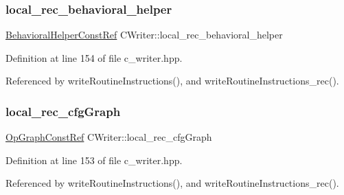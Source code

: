 \mbox{\label{classCWriter_a5bbe68dac066fd15c07a12e30b3da38a}} 
\subsubsection{\texorpdfstring{local\+\_\+rec\+\_\+behavioral\+\_\+helper}{local\_rec\_behavioral\_helper}}
{\footnotesize\ttfamily \hyperlink{behavioral__helper_8hpp_aae973b54cac87eef3b27442aa3e1e425}{Behavioral\+Helper\+Const\+Ref} C\+Writer\+::local\+\_\+rec\+\_\+behavioral\+\_\+helper\hspace{0.3cm}{\ttfamily [protected]}}



Definition at line 154 of file c\+\_\+writer.\+hpp.



Referenced by write\+Routine\+Instructions(), and write\+Routine\+Instructions\+\_\+rec().

\mbox{\label{classCWriter_abefcc76b6c076a54de2e1a90d7fb54f1}} 
\subsubsection{\texorpdfstring{local\+\_\+rec\+\_\+cfg\+Graph}{local\_rec\_cfgGraph}}
{\footnotesize\ttfamily \hyperlink{op__graph_8hpp_a9a0b240622c47584bee6951a6f5de746}{Op\+Graph\+Const\+Ref} C\+Writer\+::local\+\_\+rec\+\_\+cfg\+Graph\hspace{0.3cm}{\ttfamily [protected]}}



Definition at line 153 of file c\+\_\+writer.\+hpp.



Referenced by write\+Routine\+Instructions(), and write\+Routine\+Instructions\+\_\+rec().

\mbox{\label{classCWriter_aa58231b8be5714edffb9aea9107bfe4f}} 
